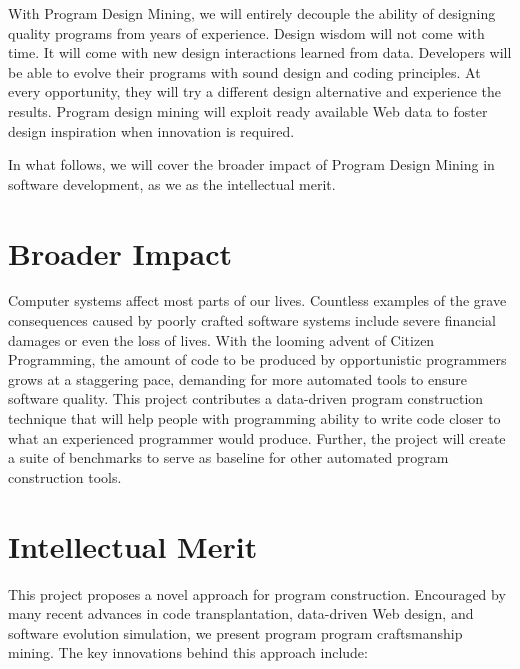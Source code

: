With Program Design Mining, we will entirely decouple the ability of 
designing quality programs from years of experience. Design wisdom will 
not come with time. It will come with new design interactions learned 
from data. Developers will be able to evolve their programs with 
sound design and coding principles. At every opportunity, they will try 
a different design alternative and experience the results. Program design 
mining will exploit ready available Web data to foster design inspiration 
when innovation is required.

In what follows, we will cover the broader impact of Program Design Mining 
in software development, as we as the intellectual merit.

\section*{Broader Impact} %
\label{sec:impact}

Computer systems affect most parts of our lives. Countless examples of 
the grave consequences caused by poorly crafted software systems include 
severe financial damages or even the loss of lives. With the looming 
advent of Citizen Programming, the amount of code to be produced by 
opportunistic programmers grows at a staggering pace, demanding for more 
automated tools to ensure software quality. This project contributes a 
data-driven program construction technique that will help people with 
programming ability to write code closer to what an experienced programmer 
would produce. Further, the project will create a suite of benchmarks to 
serve as baseline for other automated program construction tools.

\section*{Intellectual Merit} %
\label{sec:merit}

This project proposes a novel approach for program construction. 
Encouraged by many recent advances in code transplantation, 
data-driven Web design, and software evolution simulation, we 
present program program craftsmanship mining.  The key innovations 
behind this approach include: